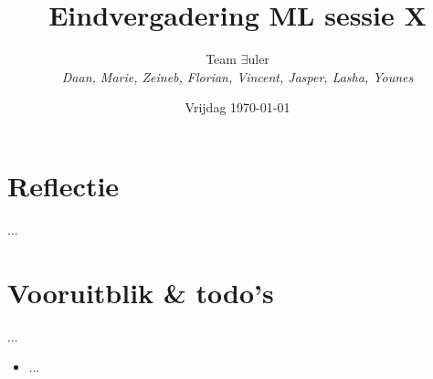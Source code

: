 \documentclass{article}
\title{Eindvergadering ML sessie X}
\author{Team $\exists$uler\\
	\textit{Daan, Marie, Zeineb, Florian, Vincent, Jasper, Lasha, Younes}}
\date{Vrijdag \today}
\begin{document}
	
\maketitle

\section*{Reflectie}

...

\section*{Vooruitblik  \& todo's}

...

\begin{itemize}
	\item ...
\end{itemize}
\end{document}
